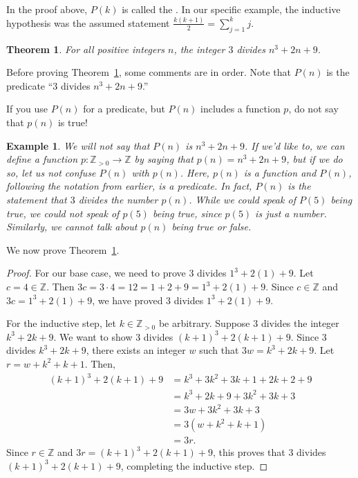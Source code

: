 \documentclass{book}
\newcounter{ekcounter}%
\theoremstyle{ekimcustom}
\newtheorem{theorem}[ekcounter]{Theorem}
\newtheorem{example}[ekcounter]{Example}
\newcommand\defn[1]{{\color{blue}{\bf #1}}}
\begin{document}
In the proof above, $P(k)$ is called the \defn{inductive hypothesis}. In our specific example, the inductive hypothesis was the assumed statement $\frac{k(k+1)}{2}= \sum_{j=1}^k j$.

\begin{theorem}\label{theorem:induction-divides}
For all positive integers $n$, the integer $3$ divides $n^3+2n+9$.
\end{theorem}
Before proving Theorem~\ref{theorem:induction-divides}, some comments are in order. Note that $P(n)$ is the predicate ``$3$ divides $n^3+2n+9$.''
\begin{bwarning}{}{}
If you use $P(n)$ for a predicate, but $P(n)$ includes a function $p$, do not say that $p(n)$ is true!
\end{bwarning}
\begin{example}
We will not say that $P(n)$ is $n^3+2n+9$. If we'd like to, we can define a function $p : \mathbb{Z}_{>0} \to \mathbb{Z}$ by saying that $p(n)=n^3+2n+9$, but if we do so, let us not confuse $P(n)$ with $p(n)$. Here, $p(n)$ is a function and $P(n)$, following the notation from earlier, is a predicate. In fact, $P(n)$ is the statement that $3$ divides the number $p(n)$. While we could speak of $P(5)$ being true, we could not speak of $p(5)$ being true, since $p(5)$ is just a number. Similarly, we cannot talk about $p(n)$ being true or false.
\end{example}
We now prove Theorem~\ref{theorem:induction-divides}.
\begin{proof}
For our base case, we need to prove $3$ divides $1^3+2(1)+9$. Let $c = 4 \in \mathbb{Z}$. Then $3c = 3 \cdot 4 = 12 = 1+2+9=1^3+2(1)+9$. Since $c \in \mathbb{Z}$ and $3c=1^3+2(1)+9$, we have proved $3$ divides $1^3+2(1)+9$.

For the inductive step, let $k \in \mathbb{Z}_{>0}$ be arbitrary. Suppose $3$ divides the integer $k^3+2k+9$. We want to show $3$ divides $(k+1)^3+2(k+1)+9$. Since $3$ divides $k^3+2k+9$, there exists an integer $w$ such that $3w =k^3+2k+9$. Let $r = w+k^2+k+1$. Then,
\begin{align*}
(k+1)^3+2(k+1)+9
&= k^3+3k^2+3k+1+2k+2+9\\
&= k^3+2k+9+3k^2+3k+3\\
&= 3w + 3k^2+3k+3\\
&= 3(w+k^2+k+1)\\
&= 3r.
\end{align*}
Since $r \in \mathbb{Z}$ and $3r=(k+1)^3+2(k+1)+9$, this proves that $3$ divides $(k+1)^3+2(k+1)+9$, completing the inductive step.
\end{proof}
\end{document}
